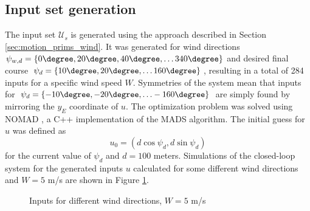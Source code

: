 \subsection{Input set generation}
The input set $\mathcal{U}_s$ is generated using the approach described in Section \ref{sec:motion_prims_wind}. 
It was generated for wind directions $\psi_{w,d}=\{0\degree,20\degree,40\degree,\hdots340\degree\}$ and desired final course 
$\psi_d=\{10\degree,20\degree,\hdots160\degree\}$, resulting in a total of 284 inputs for a specific wind speed $W$. Symmetries of the system mean that inputs
for $\psi_d=\{-10\degree,-20\degree,\hdots-160\degree\}$ are simply found by mirroring the $y_E$ coordinate of $u$.
The optimization problem was solved using NOMAD \cite{nomad}, a C++ implementation of the MADS algorithm. The initial guess for $u$ was defined as 
\begin{equation}
    u_0=(d\cos\psi_d,d\sin\psi_d)
\end{equation}
for the current value of $\psi_d$ and $d=100$ meters. 
Simulations of the closed-loop system for the generated inputs $u$ calculated for some different wind directions and $W=5$ m/s are shown in Figure \ref{fig:motion_prims}.
\begin{figure}
    \begin{center}
    \end{center}
    \caption{Inputs for different wind directions, $W=5$ m/s}
    \label{fig:motion_prims}
\end{figure}

